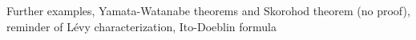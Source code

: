 Further examples, Yamata-Watanabe theorems and Skorohod theorem (no proof), reminder of Lévy characterization, Ito-Doeblin formula